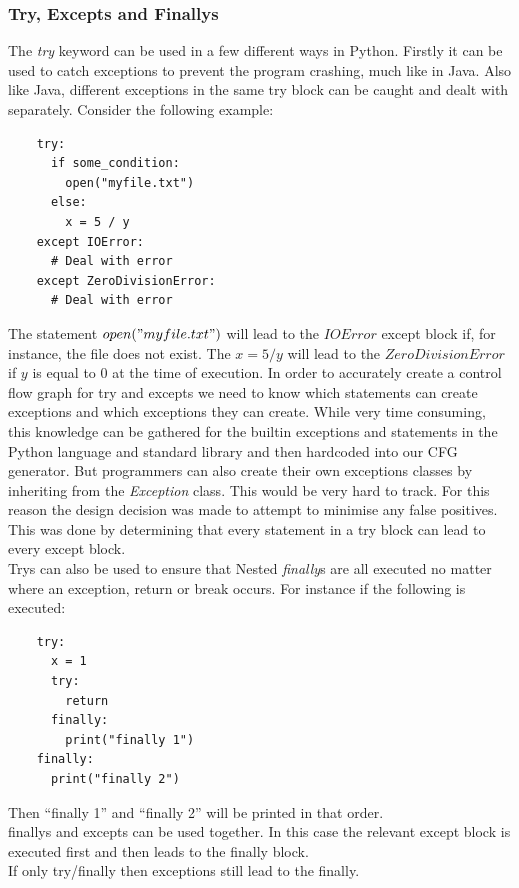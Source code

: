 \documentclass[12pt, titlepage]{article}
\begin{document}
\subsubsection{Try, Excepts and Finallys}
The \textit{try} keyword can be used in a few different ways in Python. Firstly it can be used to catch exceptions to prevent the program crashing, much like in Java. Also like Java, different exceptions in the same try block can be caught and dealt with separately. Consider the following example:
\begin{lstlisting}
    try:
      if some_condition:
        open("myfile.txt")
      else:
        x = 5 / y        
    except IOError:
      # Deal with error
    except ZeroDivisionError:
      # Deal with error
\end{lstlisting}
The statement $open("myfile.txt")$ will lead to the $IOError$ except block if, for instance, the file does not exist. The $x = 5 / y$ will lead to the $ZeroDivisionError$ if $y$ is equal to $0$ at the time of execution. In order to accurately create a control flow graph for try and excepts we need to know which statements can create exceptions and which exceptions they can create. While very time consuming, this knowledge can be gathered for the builtin exceptions and statements in the Python language and standard library and then hardcoded into our CFG generator. But programmers can also create their own exceptions classes by inheriting from the \textit{Exception} class. This would be very hard to track. For this reason the design decision was made to attempt to minimise any false positives. This was done by determining that every statement in a try block can lead to every except block. \\
Trys can also be used to ensure that Nested \textit{finally}s are all executed no matter where an exception, return or break occurs. For instance if the following is executed:
\begin{lstlisting}
    try:
      x = 1
      try:
        return
      finally:
        print("finally 1")
    finally:
      print("finally 2")
\end{lstlisting}
Then ``finally 1'' and ``finally 2'' will be printed in that order. \\
finallys and excepts can be used together. In this case the relevant except block is executed first and then leads to the finally block. \\
If only try/finally then exceptions still lead to the finally.
\end{document}
